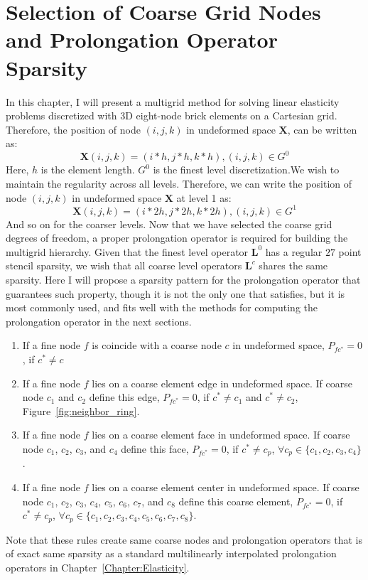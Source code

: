 \section{Selection of Coarse Grid Nodes and Prolongation Operator Sparsity}
\label{sec:p_sparsity}
In this chapter, I will present a multigrid method for solving linear elasticity problems discretized with 3D eight-node brick elements on a Cartesian grid. Therefore, the position of node $(i,j,k)$ in undeformed space $\mathbf{X}$, can be written as:
$$
\mathbf{X}(i,j,k) = (i*h,j*h,k*h), (i,j,k) \in G^0
$$
Here, $h$ is the element length. $G^0$ is the finest level discretization.We wish to maintain the regularity across all levels. Therefore, we can write the position of node $(i,j,k)$ in undeformed space $\mathbf{X}$ at level 1 as:
$$
\mathbf{X}(i,j,k) = (i*2h,j*2h,k*2h), (i,j,k) \in G^1
$$
And so on for the coarser levels. Now that we have selected the coarse grid degrees of freedom, a proper prolongation operator is required for building the multigrid hierarchy. Given that the finest level operator $\mathbf{L}^0$ has a regular $27$ point stencil sparsity, we wish that all coarse level operators $\mathbf{L}^c$ shares the same sparsity. Here I will propose a sparsity pattern for the prolongation operator that guarantees such property, though it is not the only one that satisfies, but it is most commonly used, and fits well with the methods for computing the prolongation operator in the next sections.
\begin{enumerate}
\item If a fine node $f$ is coincide with a coarse node $c$ in undeformed space, $P_{fc^*} = 0$, if $c^* \neq c$
\item If a fine node $f$ lies on a coarse element edge in undeformed space. If coarse node $c_1$ and $c_2$ define this edge, $P_{fc^*} = 0$, if $c^* \neq c_1$ and $c^* \neq c_2$, Figure~\ref{fig:neighbor_ring}.
\item If a fine node $f$ lies on a coarse element face in undeformed space. If coarse node $c_1$, $c_2$, $c_3$, and $c_4$ define this face, $P_{fc^*} = 0$, if $c^* \neq c_p$, $\forall c_p \in \{c_1,c_2,c_3,c_4\}$.
\item If a fine node $f$ lies on a coarse element center in undeformed space. If coarse node $c_1$, $c_2$, $c_3$, $c_4$, $c_5$, $c_6$, $c_7$, and $c_8$ define this coarse element, $P_{fc^*} = 0$, if $c^* \neq c_p$, $\forall c_p \in \{c_1,c_2,c_3,c_4,c_5,c_6,c_7,c_8\}$.
\end{enumerate}
 Note that these rules create same coarse nodes and prolongation operators that is of exact same sparsity as a standard multilinearly interpolated prolongation operators in Chapter~\ref{Chapter:Elasticity}.
